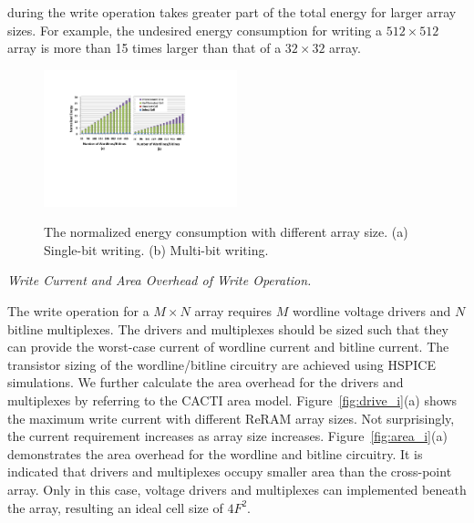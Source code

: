during the write operation takes greater part of the total energy for
larger array sizes. For example, the undesired energy consumption for
writing a $512{\times}512$ array is more than 15 times larger than that of
a $32{\times}32$ array.
\begin{figure}%
\centering
  \includegraphics[width=0.5\textwidth]{./figures/energy_f_tall2.pdf}\\
  \caption{The normalized energy consumption with different array size. (a) Single-bit writing. (b) Multi-bit writing.}\label{fig:energy}
    \vspace{-10pt}
\end{figure}

\vspace{6pt} \emph{Write Current and Area Overhead of Write Operation.}
\vspace{6pt}

The write operation for a $M \times N$ array requires $M$ wordline voltage
drivers and $N$ bitline multiplexes. The drivers and multiplexes should be
sized such that they can provide the worst-case current of wordline
current and bitline current. The transistor sizing of the wordline/bitline
circuitry are achieved using HSPICE simulations. We further calculate the
area overhead for the drivers and multiplexes by referring to the CACTI
area model. Figure~\ref{fig:drive_i}(a) shows the maximum write current
with different ReRAM array sizes. Not surprisingly, the current
requirement increases as array size increases. Figure~\ref{fig:area_i}(a)
demonstrates the area overhead for the wordline and bitline circuitry. It
is indicated that drivers and multiplexes occupy smaller area than the
cross-point array. Only in this case, voltage drivers and multiplexes can
implemented beneath the array, resulting an ideal cell size of $4F^2$.


